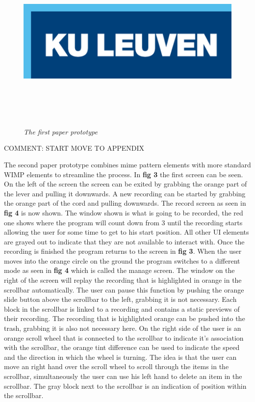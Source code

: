 \begin{figure}[H]
	\begin{center}
		\includegraphics[width=16cm, height=9cm]{KUL.png}
		\caption{\emph{The first paper prototype}}
		\label{The first paper prototype}
	\end{center}
\end{figure}

{\large COMMENT: START MOVE TO APPENDIX}

The second paper prototype combines mime pattern elements with more standard WIMP elements to streamline the process. In \textbf{ fig 3} the first screen can be seen. On the left of the screen the screen can be exited by grabbing the orange part of the lever and pulling it downwards. A new recording can be started by grabbing the orange part of the cord and pulling downwards. The record screen as seen in \textbf{ fig 4} is now shown. The window shown is what is going to be recorded, the red one shows where the program will count down from 3 until the recording starts allowing the user for some time to get to his start position. All other UI elements are grayed out to indicate that they are not available to interact with. Once the recording is finished the program returns to the screen in \textbf{ fig 3}. When the user moves into the orange circle on the ground the program switches to a different mode as seen in \textbf{ fig 4} which is called the manage screen. The window on the right of the screen will replay the recording that is highlighted in orange in the scrollbar automatically. The user can pause this function by pushing the orange slide button above the scrollbar to the left, grabbing it is not necessary. Each block in the scrollbar is linked to a recording and contains a static previews of their recording. The recording that is highlighted orange can be pushed into the trash, grabbing it is also not necessary here. On the right side of the user is an orange scroll wheel that is connected to the scrollbar to indicate it's association with the scrollbar, the orange tint difference can be used to indicate the speed and the direction in which the wheel is turning. The idea is that the user can move an right hand over the scroll wheel to scroll through the items in the scrollbar, simultaneously the user can use his left hand to delete an item in the scrollbar. The gray block next to the scrollbar is an indication of position within the scrollbar.

